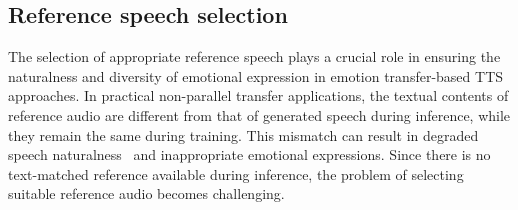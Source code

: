 \documentclass[journal,comsoc]{IEEEtran}
\begin{document}
\subsection{Reference speech selection}




The selection of appropriate reference speech plays a crucial role in ensuring the naturalness and diversity of emotional expression in emotion transfer-based TTS approaches. In practical non-parallel transfer applications, the textual contents of reference audio are different from that of generated speech during inference, while they remain the same during training. This mismatch can result in degraded speech naturalness~\cite{DBLP:conf/icml/ChangSKZT22,DBLP:journals/corr/abs-2303-04289} and inappropriate emotional expressions. Since there is no text-matched reference available during inference, the problem of selecting suitable reference audio becomes challenging.
\end{document}
